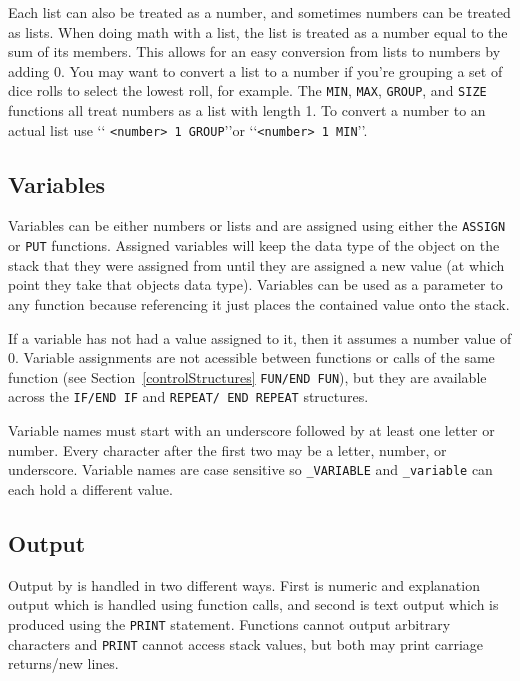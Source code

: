 Each list can also be treated as a number, and sometimes numbers can be treated
as lists. When doing math with a list, the list is treated as a number equal to
the sum of its members. This allows for an easy conversion from lists to numbers
by adding 0. You may want to convert a list to a number if you're grouping a set
of dice rolls to select the lowest roll, for example. The \texttt{MIN},
\texttt{MAX}, \texttt{GROUP}, and \texttt{SIZE} functions all treat numbers as
a list with length 1. To convert a number to an actual list use \lq\lq%
\texttt{<number> 1 GROUP}\rq\rq or \lq\lq\texttt{<number> 1 MIN}\rq\rq.


\subsection{Variables}
\label{variables}
Variables can be either numbers or lists and are assigned using either the
\texttt{ASSIGN} or \texttt{PUT} functions. Assigned variables will keep the
data type of the object on the stack that they were assigned from until they
are assigned a new value (at which point they take that objects data type).
Variables can be used as a parameter to any function because referencing it
just places the contained value onto the stack.

If a variable has not had a value assigned to it, then it assumes a number
value of 0. Variable assignments are not acessible between functions or calls
of the same function (see Section~\ref{controlStructures} \texttt{FUN/END FUN}),
but they are available across the \texttt{IF/END IF} and \texttt{REPEAT/%
END REPEAT} structures.

Variable names must start with an underscore followed by at least one letter
or number. Every character after the first two may be a letter, number, or
underscore. Variable names are case sensitive so \texttt{\_VARIABLE} and
\texttt{\_variable} can each hold a different value.

\subsection{Output}
\label{output}
Output by \progLogo is handled in two different ways. First is numeric and
explanation output which is handled using function calls, and second is
text output which is produced using the \texttt{PRINT} statement. Functions
cannot output arbitrary characters and \texttt{PRINT} cannot access stack
values, but both may print carriage returns/new lines.

